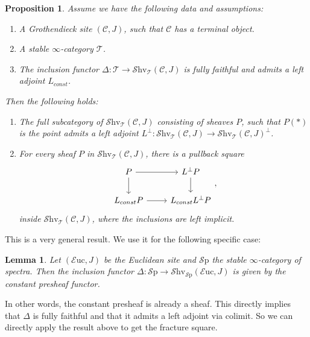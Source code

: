 \documentclass[10pt]{amsart}
\newcommand{\C}{\mathscr{C}}
\newcommand{\T}{\mathscr{T}}
\newcommand{\Sp}{\mathscr{S}\mathrm{p}}
\newcommand{\Euc}{\mathscr{E}\mathrm{uc}}
\newcommand{\Shv}{\mathscr{S}\mathrm{hv}}
\newtheorem{lemma}[equation]{Lemma}
\newtheorem{proposition}[equation]{Proposition}
\theoremstyle{definition}
\theoremstyle{remark}
\numberwithin{equation}{section}
\begin{document}
\begin{proposition}
  Assume we have the following data and assumptions:
  \begin{enumerate}
    \item A Grothendieck site $(\C,J)$, such that $\C$ has a terminal object.
    \item A stable $\infty$-category $\T$.
    \item The inclusion functor $\Delta\colon \T \to \Shv_\T(\C,J)$ is fully faithful and admits a left adjoint $L_{const}$. 
  \end{enumerate}
  Then the following holds:
  \begin{enumerate}
    \item The full subcategory of $\Shv_\T(\C,J)$ consisting of sheaves $P$, such that $P(*)$ is the point admits a left adjoint $L^{\bot}\colon \Shv_\T(\C,J) \to \Shv_\T(\C,J)^\bot$.
    \item For every sheaf $P$ in $\Shv_\T(\C,J)$, there is a pullback square
    \[
    \begin{tikzcd}
      P \arrow[r] \arrow[d] & L^{\bot}P \arrow[d] \\
      L_{const}P \arrow[r] & L_{const}L^{\bot}P
    \end{tikzcd},
    \]
    inside $\Shv_\T(\C,J)$, where the inclusions are left implicit.
  \end{enumerate} 
\end{proposition}

This is a very general result. We use it for the following specific case:
\begin{lemma}
 Let $(\Euc,J)$ be the Euclidean site and $\Sp$ the stable $\infty$-category of spectra. Then the inclusion functor $\Delta\colon \Sp \to \Shv_{\Sp}(\Euc,J)$ is given by the constant presheaf functor.
\end{lemma}

In other words, the constant presheaf is already a sheaf. This directly implies that $\Delta$ is fully faithful and that it admits a left adjoint via colimit. So we can directly apply the result above to get the fracture square.
\end{document}
